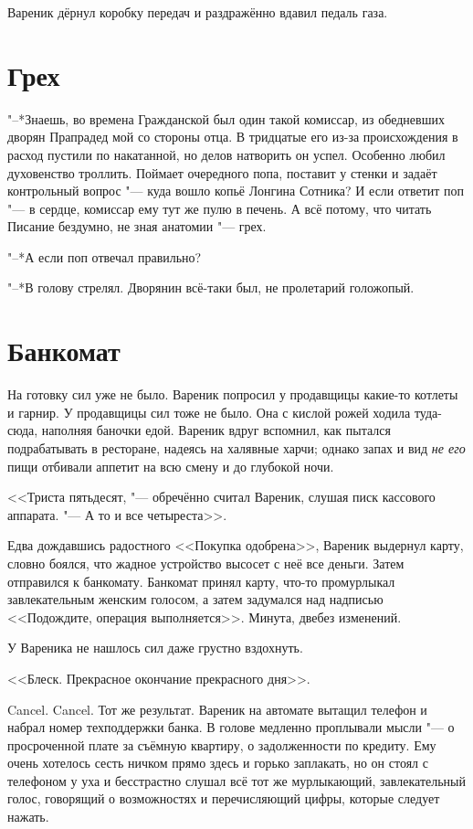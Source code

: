 Вареник дёрнул коробку передач и раздражённо вдавил педаль газа.

\section{Грех}

"--*Знаешь, во времена Гражданской был один такой комиссар, из обедневших дворян\ldotst
Прапрадед мой со стороны отца.
В тридцатые его из-за происхождения в расход пустили по накатанной, но делов натворить он успел.
Особенно любил духовенство троллить.
Поймает очередного попа, поставит у стенки и задаёт контрольный вопрос "--- куда вошло копьё Лонгина Сотника?
И если ответит поп "--- в сердце, комиссар ему тут же пулю в печень.
А всё потому, что читать Писание бездумно, не зная анатомии "--- грех.

"--*А если поп отвечал правильно?

"--*В голову стрелял.
Дворянин всё-таки был, не пролетарий голожопый.

\section{Банкомат}

На готовку сил уже не было.
Вареник попросил у продавщицы какие-то котлеты и гарнир.
У продавщицы сил тоже не было.
Она с кислой рожей ходила туда-сюда, наполняя баночки едой.
Вареник вдруг вспомнил, как пытался подрабатывать в ресторане, надеясь на халявные харчи;
однако запах и вид \emph{не его} пищи отбивали аппетит на всю смену и до глубокой ночи. 

<<Триста пятьдесят, "--- обречённо считал Вареник, слушая писк кассового аппарата.
"--- А то и все четыреста>>.

Едва дождавшись радостного <<Покупка одобрена>>, Вареник выдернул карту, словно боялся, что жадное устройство высосет с неё все деньги.
Затем отправился к банкомату.
Банкомат принял карту, что-то промурлыкал завлекательным женским голосом, а затем задумался над надписью <<Подождите, операция выполняется>>.
Минута, две\ldotst без изменений.

У Вареника не нашлось сил даже грустно вздохнуть.

<<Блеск.
Прекрасное окончание прекрасного дня>>.

Cancel. Cancel.
Тот же результат.
Вареник на автомате вытащил телефон и набрал номер техподдержки банка.
В голове медленно проплывали мысли "--- о просроченной плате за съёмную квартиру, о задолженности по кредиту.
Ему очень хотелось сесть ничком прямо здесь и горько заплакать, но он стоял с телефоном у уха и бесстрастно слушал всё тот же мурлыкающий, завлекательный голос, говорящий о возможностях и перечисляющий цифры, которые следует нажать.

